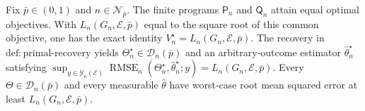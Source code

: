 Fix \(\bar p\in(0,1)\) and \(n\in\mathcal N_{\bar p}\). The finite programs \(\mathsf P_n\) and \(\mathsf Q_n\) attain equal optimal objectives. With \(L_n(G_n,\mathcal E,\bar p)\) equal to the square root of this common objective, one has the exact identity \(V_n^\star=L_n(G_n,\mathcal E,\bar p)\). The recovery in \(\mathrm{def{:}primal\text{-}recovery}\) yields \(\Theta_n^\star\in\mathcal D_n(\bar p)\) and an arbitrary-outcome estimator \(\widehat\theta_n^\star\) satisfying \(\sup_{y\in\mathcal Y_n(\mathcal E)}\operatorname{RMSE}_n(\Theta_n^\star,\widehat\theta_n^\star;y)=L_n(G_n,\mathcal E,\bar p)\). Every \(\Theta\in\mathcal D_n(\bar p)\) and every measurable \(\widehat\theta\) have worst-case root mean squared error at least \(L_n(G_n,\mathcal E,\bar p)\).